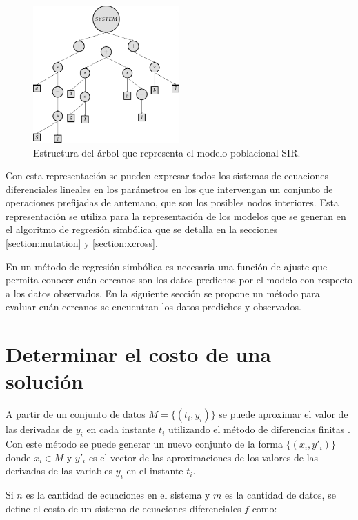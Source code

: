 \begin{figure}[h]
    \centering
    \includegraphics[width=0.5\textwidth]{"figures/sir_example.pdf"}
    \caption{Estructura del árbol que representa el modelo poblacional SIR.}
    \label{tikzpicture:sir_example}
\end{figure}

Con esta representación se pueden expresar todos los sistemas de ecuaciones diferenciales lineales en los parámetros en los que intervengan un conjunto de operaciones prefijadas de antemano, que son los posibles nodos interiores. Esta representación se utiliza para la representación de los modelos que se generan en el algoritmo de regresión simbólica que se detalla en la secciones \ref{section:mutation} y \ref{section:xcross}.

En un método de regresión simbólica es necesaria una función de ajuste que permita conocer cuán cercanos son los datos predichos por el modelo con respecto a los datos observados. En la siguiente sección se propone un método para evaluar cuán cercanos se encuentran los datos predichos y observados.

\section{Determinar el costo de una solución}\label{section:solution_cost}

A partir de un conjunto de datos $M = \{(t_i, y_i)\}$ se puede aproximar el valor de las derivadas de $y_i$ en cada instante $t_i$ utilizando el método de diferencias finitas \cite{gaucel2014learning}. Con este método se puede generar un nuevo conjunto de la forma $\{(x_i, y'_i)\}$ donde $x_i \in M$ y $y'_i$ es el vector de las aproximaciones de los valores de las derivadas de las variables $y_i$ en el instante $t_i$.

Si $n$ es la cantidad de ecuaciones en el sistema y $m$ es la cantidad de datos, se define el costo de un sistema de ecuaciones diferenciales $f$ como:

